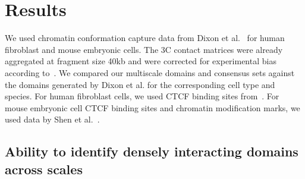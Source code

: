 \documentclass[12pt]{cmuthesis}
\begin{document}
%
%
\section{Results}

  We used chromatin conformation capture data from Dixon et al.~\cite{Dixon2012} for human fibroblast and mouse embryonic cells. The 3C contact matrices were already aggregated at fragment size 40kb and were corrected for experimental bias according to~\cite{Yaffe2011}. We compared our multiscale domains and consensus sets against the domains generated by Dixon et al. for the corresponding cell type and species.
  For human fibroblast cells, we used CTCF binding sites from~\cite{Kim2007}.
  For mouse embryonic cell CTCF binding sites and chromatin modification marks, we used data by Shen et al.~\cite{Shen2012}.



  \subsection{Ability to identify densely interacting domains across scales}

  
\end{document}
